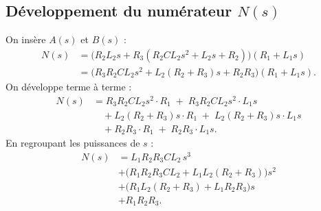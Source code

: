 \documentclass[12pt,a4paper]{article}
\begin{document}
\subsection{Développement du numérateur \(N(s)\)}
On insère \(A(s)\) et \(B(s)\) :
\begin{align}
N(s) &= \bigl( R_2 L_2 s + R_3 (R_2 C L_2 s^2 + L_2 s + R_2) \bigr) (R_1 + L_1 s) \nonumber\\
     &= \bigl( R_3 R_2 C L_2 s^2 + L_2(R_2+R_3) s + R_2 R_3 \bigr) (R_1 + L_1 s) .
\end{align}
On développe terme à terme :
\[
\begin{aligned}
N(s) &=
R_3 R_2 C L_2 s^2 \cdot R_1 \;+\; R_3 R_2 C L_2 s^2 \cdot L_1 s \\
&\quad + L_2(R_2+R_3) s \cdot R_1 \;+\; L_2(R_2+R_3) s \cdot L_1 s \\
&\quad + R_2 R_3 \cdot R_1 \;+\; R_2 R_3 \cdot L_1 s .
\end{aligned}
\]
En regroupant les puissances de \(s\) :
\begin{equation}
\boxed{
\begin{aligned}
N(s) &= L_1 R_2 R_3 C L_2 \, s^3 \\
     &+ \bigl( R_1 R_2 R_3 C L_2 + L_1 L_2 (R_2+R_3) \bigr) s^2 \\
     &+ \bigl( R_1 L_2 (R_2+R_3) + L_1 R_2 R_3 \bigr) s \\
     &+ R_1 R_2 R_3 .
\end{aligned}}
\label{eq:N}
\end{equation}
\end{document}
